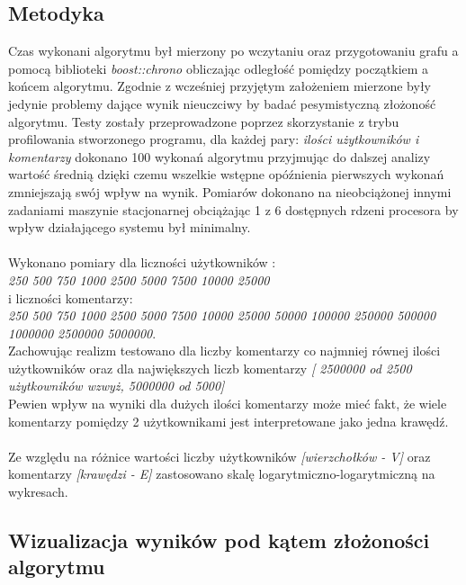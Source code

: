 \documentclass[11pt]{article}
\newcommand{\+}{\discretionary{\mbox{\scriptsize$\hookleftarrow$}}{}{}}
\begin{document}
\subsection{Metodyka}
Czas wykonani algorytmu był mierzony po wczytaniu oraz przygotowaniu grafu a pomocą biblioteki \textsl{boost::chrono} obliczając odległość pomiędzy początkiem a końcem algorytmu. Zgodnie z wcześniej przyjętym założeniem mierzone były jedynie problemy dające wynik nieuczciwy by badać pesymistyczną złożoność algorytmu. Testy zostały przeprowadzone poprzez skorzystanie z trybu profilowania stworzonego programu, dla każdej pary: \textsl{ilości użytkowników i komentarzy} dokonano 100 wykonań algorytmu przyjmując do dalszej analizy wartość średnią dzięki czemu wszelkie wstępne opóźnienia pierwszych wykonań zmniejszają swój wpływ na wynik. Pomiarów dokonano na nieobciążonej innymi zadaniami maszynie stacjonarnej obciążając 1 z 6 dostępnych rdzeni procesora by wpływ działającego systemu był minimalny.\\ \\
Wykonano pomiary dla liczności użytkowników : \\
\textit{250 500 750 1000 2500 5000 7500 10000 25000} \\
i liczności komentarzy:\\
\textit{250 500 750 1000 2500 5000 7500 10000 25000 50000 100000 250000 500000 1000000 2500000 5000000}.\\
Zachowując realizm testowano dla liczby komentarzy co najmniej równej ilości użytkowników oraz dla największych liczb komentarzy \textit{[ 2500000 od 2500 użytkowników wzwyż, 5000000 od 5000]}\\
Pewien wpływ na wyniki dla dużych ilości komentarzy może mieć fakt, że wiele komentarzy pomiędzy 2 użytkownikami jest interpretowane jako jedna krawędź.\\\\
Ze względu na różnice wartości liczby użytkowników \textit{[wierzchołków - V]} oraz komentarzy \textit{[krawędzi - E]} zastosowano skalę logarytmiczno-logarytmiczną na wykresach.
\subsection{Wizualizacja wyników pod kątem złożoności algorytmu}
\end{document}
